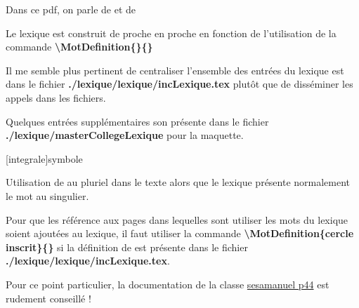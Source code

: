 \documentclass[nocrop]{\persopath/sesamanuel}
\begin{document}
Dans ce pdf, on parle de  et de 

\medskip

Le lexique est construit de proche en proche en fonction de l'utilisation de la commande \textbf{\textbackslash MotDefinition\{\}\{\}}

\medskip

Il me semble plus pertinent de centraliser l'ensemble des entrées du lexique est dans le fichier \textbf{./lexique/lexique/incLexique.tex}
plutôt que de disséminer les appels dans les fichiers.

\medskip

Quelques entrées supplémentaires son présente dans le fichier \textbf{./lexique/masterCollegeLexique} pour la maquette.

\medskip


\MotDefinition{$\int$}[integrale]{symbole}

Utilisation de  au pluriel dans le texte alors que le lexique présente normalement le mot au singulier.

\medskip

Pour que les référence aux pages dans lequelles sont utiliser les mots du lexique soient ajoutées au lexique,
il faut utiliser la commande \textbf{\textbackslash MotDefinition\{cercle inscrit\}\{\}} si la définition de  est présente dans le fichier \textbf{./lexique/lexique/incLexique.tex}.

\medskip

Pour ce point particulier, la documentation de la classe \href{https://distrib-coffee.ipsl.jussieu.fr/pub/mirrors/ctan/macros/latex/contrib/sesamanuel/sesamath-doc-fr.pdf}{sesamanuel p44} est rudement conseillé !


\AfficheLexique 
\end{document}
